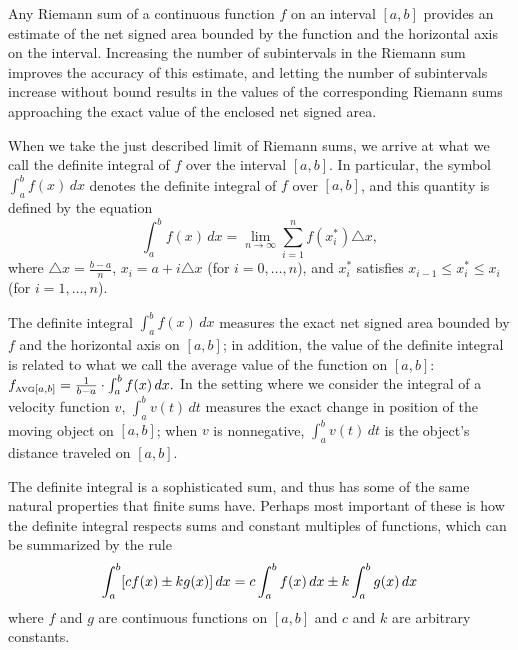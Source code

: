 \begin{summary}
\item Any Riemann sum of a continuous function $f$ on an interval $[a,b]$ provides an estimate of the net signed area bounded by the function and the horizontal axis on the interval.  Increasing the number of subintervals in the Riemann sum improves the accuracy of this estimate, and letting the number of subintervals increase without bound results in the values of the corresponding Riemann sums approaching the exact value of the enclosed net signed area.
\item When we take the just described limit of Riemann sums, we arrive at what we call the definite integral of $f$ over the interval $[a,b]$.  In particular, the symbol $\int_a^b f(x) \, dx$ denotes the definite integral of $f$ over $[a,b]$, and this quantity is defined by the equation
$$\int_a^b f(x) \, dx = \lim_{n \to \infty} \sum_{i=1}^{n} f(x_i^*) \triangle x,$$
where $\triangle x = \frac{b-a}{n}$, $x_i = a + i\triangle x$ (for $i = 0, \ldots, n$), and $x_i^*$ satisfies $x_{i-1} \le x_i^* \le x_i$ (for $i = 1, \ldots, n$).
\item The definite integral $\int_a^b f(x) \,dx$ measures the exact net signed area bounded by $f$ and the horizontal axis on $[a,b]$; in addition, the value of the definite integral is related to what we call the average value of the function on $[a,b]$: $f_{\mbox{\tiny{AVG}}[a,b]} = \frac{1}{b-a} \cdot \int_a^b f(x) \, dx.$  In the setting where we consider the integral of a velocity function $v$, $\int_a^b v(t) \,dt$ measures the exact change in position of the moving object on $[a,b]$; when $v$ is nonnegative, $\int_a^b v(t) \,dt$ is the object's distance traveled on $[a,b]$.  
\item The definite integral is a sophisticated sum, and thus has some of the same natural properties that finite sums have.  Perhaps most important of these is how the definite integral respects sums and constant multiples of functions, which can be summarized by the rule
$$\displaystyle \int_a^b [c f(x) \pm k g(x)] \,dx = c \int_a^b f(x) \,dx \pm k \int_a^b g(x) \,dx$$
where $f$ and $g$ are continuous functions on $[a,b]$ and $c$ and $k$ are arbitrary constants.
\end{summary}

\nin \hrulefill

 

\clearpage
